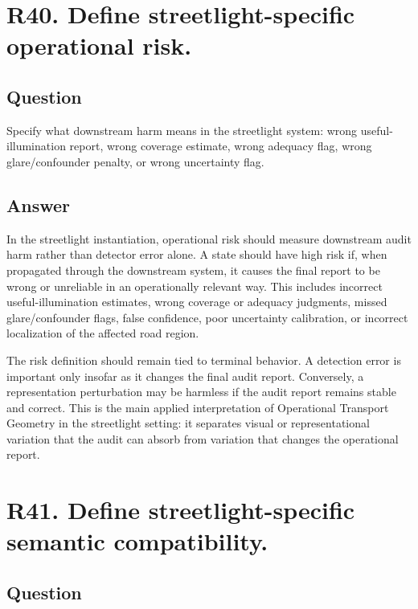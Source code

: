 \documentclass[11pt,a4paper]{article}
\begin{document}
\section*{R40. Define streetlight-specific operational risk.}

\subsection*{Question}

Specify what downstream harm means in the streetlight system: wrong useful-illumination report, wrong coverage estimate, wrong adequacy flag, wrong glare/confounder penalty, or wrong uncertainty flag.

\subsection*{Answer}

In the streetlight instantiation, operational risk should measure downstream audit harm rather than detector error alone. A state should have high risk if, when propagated through the downstream system, it causes the final report to be wrong or unreliable in an operationally relevant way. This includes incorrect useful-illumination estimates, wrong coverage or adequacy judgments, missed glare/confounder flags, false confidence, poor uncertainty calibration, or incorrect localization of the affected road region.

The risk definition should remain tied to terminal behavior. A detection error is important only insofar as it changes the final audit report. Conversely, a representation perturbation may be harmless if the audit report remains stable and correct. This is the main applied interpretation of Operational Transport Geometry in the streetlight setting: it separates visual or representational variation that the audit can absorb from variation that changes the operational report.

\section*{R41. Define streetlight-specific semantic compatibility.}

\subsection*{Question}
\end{document}

